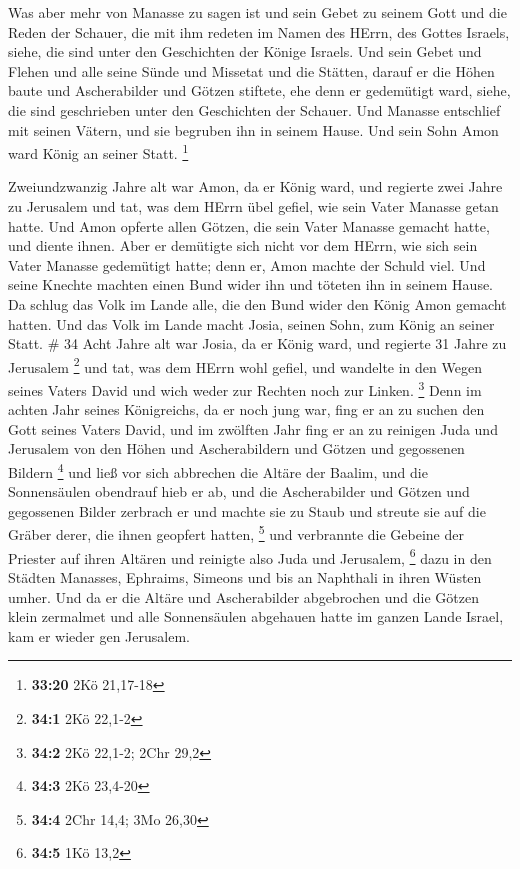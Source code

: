  Was aber mehr von Manasse zu sagen ist und sein Gebet zu
seinem Gott und die Reden der Schauer, die mit ihm redeten im Namen des
HErrn, des Gottes Israels, siehe, die sind unter den Geschichten der
Könige Israels.  Und sein Gebet und Flehen und alle seine
Sünde und Missetat und die Stätten, darauf er die Höhen baute und
Ascherabilder und Götzen stiftete, ehe denn er gedemütigt ward, siehe,
die sind geschrieben unter den Geschichten der Schauer. 
Und Manasse entschlief mit seinen Vätern, und sie begruben ihn in seinem
Hause. Und sein Sohn Amon ward König an seiner Statt. \footnote{\textbf{33:20}
  2Kö 21,17-18}

 Zweiundzwanzig Jahre alt war Amon, da er König ward, und
regierte zwei Jahre zu Jerusalem  und tat, was dem HErrn
übel gefiel, wie sein Vater Manasse getan hatte. Und Amon opferte allen
Götzen, die sein Vater Manasse gemacht hatte, und diente ihnen.
 Aber er demütigte sich nicht vor dem HErrn, wie sich sein
Vater Manasse gedemütigt hatte; denn er, Amon machte der Schuld viel.
 Und seine Knechte machten einen Bund wider ihn und töteten
ihn in seinem Hause.  Da schlug das Volk im Lande alle, die
den Bund wider den König Amon gemacht hatten. Und das Volk im Lande
macht Josia, seinen Sohn, zum König an seiner Statt. \# 34 
Acht Jahre alt war Josia, da er König ward, und regierte 31 Jahre zu
Jerusalem \footnote{\textbf{34:1} 2Kö 22,1-2}  und tat, was
dem HErrn wohl gefiel, und wandelte in den Wegen seines Vaters David und
wich weder zur Rechten noch zur Linken. \footnote{\textbf{34:2} 2Kö
  22,1-2; 2Chr 29,2}  Denn im achten Jahr seines
Königreichs, da er noch jung war, fing er an zu suchen den Gott seines
Vaters David, und im zwölften Jahr fing er an zu reinigen Juda und
Jerusalem von den Höhen und Ascherabildern und Götzen und gegossenen
Bildern \footnote{\textbf{34:3} 2Kö 23,4-20}  und ließ vor
sich abbrechen die Altäre der Baalim, und die Sonnensäulen obendrauf
hieb er ab, und die Ascherabilder und Götzen und gegossenen Bilder
zerbrach er und machte sie zu Staub und streute sie auf die Gräber
derer, die ihnen geopfert hatten, \footnote{\textbf{34:4} 2Chr 14,4; 3Mo
  26,30}  und verbrannte die Gebeine der Priester auf ihren
Altären und reinigte also Juda und Jerusalem, \footnote{\textbf{34:5}
  1Kö 13,2}  dazu in den Städten Manasses, Ephraims, Simeons
und bis an Naphthali in ihren Wüsten umher.  Und da er die
Altäre und Ascherabilder abgebrochen und die Götzen klein zermalmet und
alle Sonnensäulen abgehauen hatte im ganzen Lande Israel, kam er wieder
gen Jerusalem.

